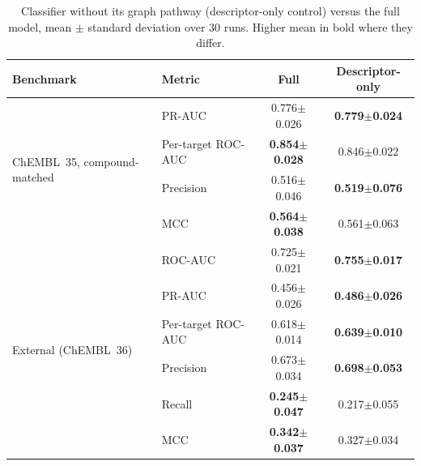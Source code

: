 \documentclass[11pt,letterpaper]{article}
\begin{document}
\begin{table}[!t]
\centering
\caption{Classifier without its graph pathway (descriptor-only control) versus the full model, mean $\pm$ standard deviation over 30 runs. Higher mean in bold where they differ.}
\label{tab:desc_only}
\small
\begin{tabular}{llcc}
\toprule
\textbf{Benchmark} & \textbf{Metric} & \textbf{Full} & \textbf{Descriptor-only} \\
\midrule
\multirow{4}{*}{ChEMBL~35, compound-matched}
 & PR-AUC & 0.776$\pm$0.026 & \textbf{0.779$\pm$0.024} \\
 & Per-target ROC-AUC & \textbf{0.854$\pm$0.028} & 0.846$\pm$0.022 \\
 & Precision & 0.516$\pm$0.046 & \textbf{0.519$\pm$0.076} \\
 & MCC & \textbf{0.564$\pm$0.038} & 0.561$\pm$0.063 \\
\midrule
\multirow{6}{*}{External (ChEMBL~36)}
 & ROC-AUC & 0.725$\pm$0.021 & \textbf{0.755$\pm$0.017} \\
 & PR-AUC & 0.456$\pm$0.026 & \textbf{0.486$\pm$0.026} \\
 & Per-target ROC-AUC & 0.618$\pm$0.014 & \textbf{0.639$\pm$0.010} \\
 & Precision & 0.673$\pm$0.034 & \textbf{0.698$\pm$0.053} \\
 & Recall & \textbf{0.245$\pm$0.047} & 0.217$\pm$0.055 \\
 & MCC & \textbf{0.342$\pm$0.037} & 0.327$\pm$0.034 \\
\bottomrule
\end{tabular}
\end{table}
\end{document}
